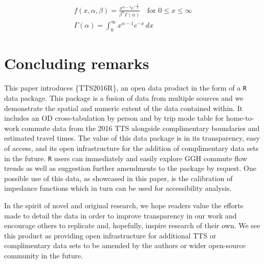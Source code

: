 \documentclass[Royal,times,sageh]{sagej}
\begin{document}
\renewcommand{\[}{\begin{equation}}
\renewcommand{\]}{\end{equation}}

\[
\begin{aligned}
f(x, \alpha, \beta) = \frac {x^{\alpha-1}e^{-\frac{x}{\beta}}}{ \beta^{\alpha}\Gamma(\alpha)} \quad \text{for } 0 \leq x \leq \infty \label{gamma-dist} \\
\Gamma(\alpha) =  \int_{0}^{\infty} x^{\alpha-1}e^{-x} \,dx
\end{aligned}
\]

\hypertarget{concluding-remarks}{%
\section{Concluding remarks}\label{concluding-remarks}}

This paper introduces \{TTS2016R\}, an open data product in the form of
a \texttt{R} data package. This package is a fusion of data from
multiple sources and we demonstrate the spatial and numeric extent of
the data contained within. It includes an OD cross-tabulation by person
and by trip mode table for home-to-work commute data from the 2016 TTS
alongside complimentary boundaries and estimated travel times. The value
of this data package is in its transparency, easy of access, and its
open infrastructure for the addition of complimentary data sets in the
future. \texttt{R} users can immediately and easily explore GGH commute
flow trends as well as suggestion further amendments to the package by
request. One possible use of this data, as showcased in this paper, is
the calibration of impedance functions which in turn can be used for
accessibility analysis.

In the spirit of novel and original research, we hope readers value the
efforts made to detail the data in order to improve transparency in our
work and encourage others to replicate and, hopefully, inspire research
of their own. We see this product as providing open infrastructure for
additional TTS or complimentary data sets to be amended by the authors
or wider open-source community in the future.



\end{document}
